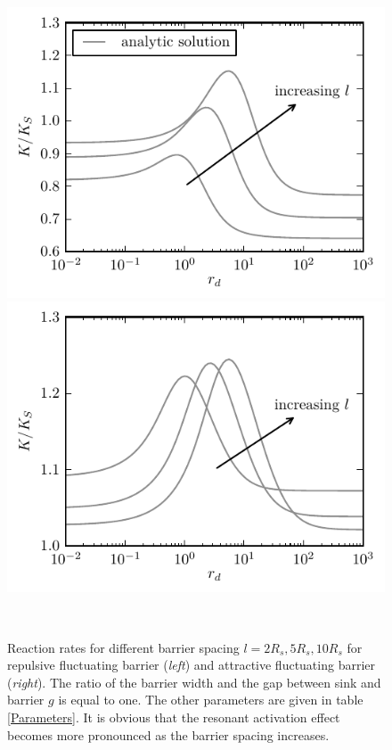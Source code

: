     \begin{figure}[b!]
\begin{minipage}[t]{.5 \textwidth}
        \hspace{-0.05 \textwidth}\includegraphics[width = 1.05 \textwidth]{plots/l2_rb_rates.pdf}
\end{minipage}\begin{minipage}[t]{.5 \textwidth}
        \includegraphics[width = 1.05 \textwidth]{plots/l2_ab_rates.pdf}
\end{minipage}\\
\begin{minipage}[t]{1 \textwidth}
        \caption{Reaction rates for different barrier spacing $l = 2 R_s, 5 R_s ,10 R_s$ for repulsive fluctuating barrier (\emph{left}) and attractive fluctuating barrier (\emph{right}). The ratio of the barrier width and the gap between sink and barrier $g$ is equal to one. The other parameters are given in table \ref{Parameters}. It is obvious that the resonant activation effect becomes more pronounced as the barrier spacing increases.\label{fig:var_l}}
\end{minipage}
    \end{figure}

